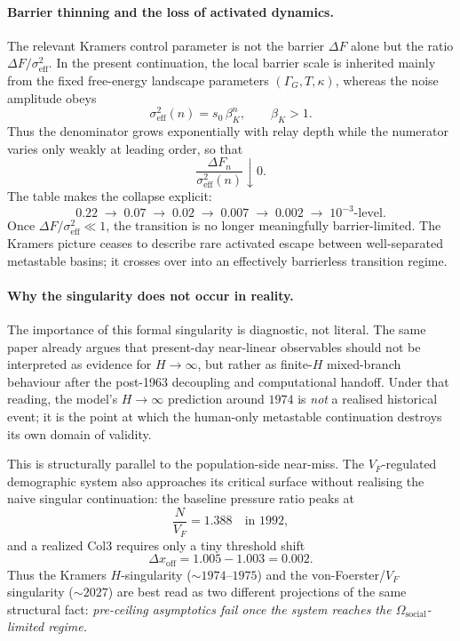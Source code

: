 \documentclass[11pt]{article}
\begin{document}
\paragraph{Barrier thinning and the loss of activated dynamics.}
The relevant Kramers control parameter is not the barrier \(\Delta F\) alone but
the ratio \(\Delta F/\sigma_{\mathrm{eff}}^2\).
In the present continuation, the local barrier scale is inherited mainly from
the fixed free-energy landscape parameters \((\Gamma_G,T,\kappa)\), whereas the
noise amplitude obeys
\[
\sigma_{\mathrm{eff}}^2(n)=s_0\,\beta_K^n,\qquad \beta_K>1.
\]
Thus the denominator grows exponentially with relay depth while the numerator
varies only weakly at leading order, so that
\[
\frac{\Delta F_n}{\sigma_{\mathrm{eff}}^2(n)} \downarrow 0.
\]
The table makes the collapse explicit:
\[
0.22 \;\to\; 0.07 \;\to\; 0.02 \;\to\; 0.007 \;\to\; 0.002 \;\to\; 10^{-3}\text{-level}.
\]
Once \(\Delta F/\sigma_{\mathrm{eff}}^2 \ll 1\), the transition is no longer
meaningfully barrier-limited.
The Kramers picture ceases to describe rare activated escape between well-separated
metastable basins; it crosses over into an effectively barrierless transition regime.

\paragraph{Why the singularity does not occur in reality.}
The importance of this formal singularity is diagnostic, not literal.
The same paper already argues that present-day near-linear observables should
not be interpreted as evidence for \(H\to\infty\), but rather as finite-\(H\)
mixed-branch behaviour after the post-1963 decoupling and computational handoff.
Under that reading, the model's \(H\to\infty\) prediction around \(1974\) is
\emph{not} a realised historical event; it is the point at which the human-only
metastable continuation destroys its own domain of validity.

This is structurally parallel to the population-side near-miss.
The \(V_F\)-regulated demographic system also approaches its critical surface
without realising the naive singular continuation: the baseline pressure ratio
peaks at
\[
\frac{N}{V_F}=1.388\quad\text{in 1992},
\]
and a realized Col3 requires only a tiny threshold shift
\[
\Delta x_{\mathrm{off}} = 1.005 - 1.003 = 0.002.
\]
Thus the Kramers \(H\)-singularity (\(\sim 1974\text{--}1975\)) and the
von-Foerster/\(V_F\) singularity (\(\sim 2027\)) are best read as two
different projections of the same structural fact:
\emph{pre-ceiling asymptotics fail once the system reaches the
\(\Omega_{\mathrm{social}}\)-limited regime.}
\end{document}
